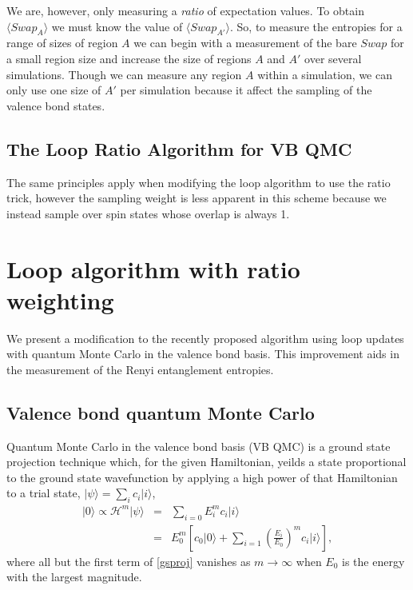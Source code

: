 \documentclass[prb,aps,twocolumn,floatfix,amsmath,amssymb,superscriptaddress,tightenlines]{revtex4}
\begin{document}
We are, however, only measuring a {\it ratio} of expectation values.
To obtain $ \langle Swap_A \rangle $ we must know the value of $ \langle Swap_{A'} \rangle $.
So, to measure the entropies for a range of sizes of region $A$ we can begin with a measurement of the bare $Swap$ for a small region size and increase the size of regions $A$ and $A'$ over several simulations.
Though we can measure any region $A$ within a simulation, we can only use one size of  $A'$ per simulation because it affect the sampling of the valence bond states.






\subsection{The Loop Ratio Algorithm for VB QMC}
The same principles apply when modifying the loop algorithm to use the ratio trick, however the sampling weight is less apparent in this scheme because we instead sample over spin states whose overlap is always 1.

\newpage
\section{Loop algorithm with ratio weighting}

We present a modification to the recently proposed algorithm using loop updates with quantum Monte Carlo in the valence bond basis.  This improvement aids in the measurement of the Renyi entanglement entropies.


\subsection{Valence bond quantum Monte Carlo}

Quantum Monte Carlo in the valence bond basis (VB QMC) is a ground state projection technique which, for the given Hamiltonian, yeilds a state proportional to the ground state wavefunction by applying a high power of that Hamiltonian to a  trial state, $\lvert \psi \rangle = \sum_i c_i \lvert i \rangle$,
\begin{eqnarray}
	\lvert 0 \rangle \propto \mathcal{H}^m \lvert \psi \rangle &=& \sum_{i=0} E_i^m c_i\lvert i \rangle  \\
	&=& E_0^m \left[ c_0 \lvert 0 \rangle + \sum_{i=1} \left(\frac{E_i}{E_0}\right) ^m c_i\lvert i \rangle \right] \label{gsproj},
\end{eqnarray}
where all but the first term of \eqref{gsproj} vanishes as $m \rightarrow \infty$ when $E_0$ is the energy with the largest magnitude.
\end{document}
